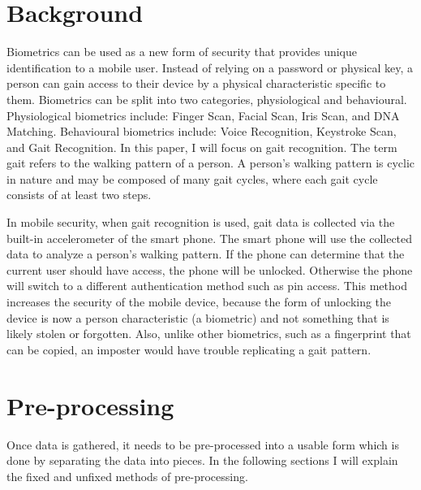 \documentclass{sig-alternate}
\begin{document}
\section{Background}
	Biometrics can be used as a new form of security that provides unique identification to a mobile user. Instead of relying on a password or physical key, a person can gain access to their device by a physical characteristic specific to them. Biometrics can be split into two categories, physiological and behavioural. Physiological biometrics include: Finger Scan, Facial Scan, Iris Scan, and DNA Matching. Behavioural biometrics include: Voice Recognition, Keystroke Scan, and Gait Recognition. In this paper, I will focus on gait recognition. The term gait refers to the walking pattern of a person. A person's walking pattern is cyclic in nature and may be composed of many gait cycles, where each gait cycle consists of at least two steps.~\cite{Sujithra:2012} 
	
	In mobile security, when gait recognition is used, gait data is collected via the built-in accelerometer of the smart phone. The smart phone will use the collected data to analyze a person's walking pattern. If the phone can determine that the current user should have access, the phone will be unlocked. Otherwise the phone will switch to a different authentication method such as pin access. This method increases the security of the mobile device, because the form of unlocking the device is now a person characteristic (a biometric) and not something that is likely stolen or forgotten. Also, unlike other biometrics, such as a fingerprint that can be copied, an imposter would have trouble replicating a gait pattern.


\section{Pre-processing} 
	Once data is gathered, it needs to be pre-processed into a usable form which is done by separating the data into pieces. In the following sections I will explain the fixed and unfixed methods of pre-processing.
\end{document}
